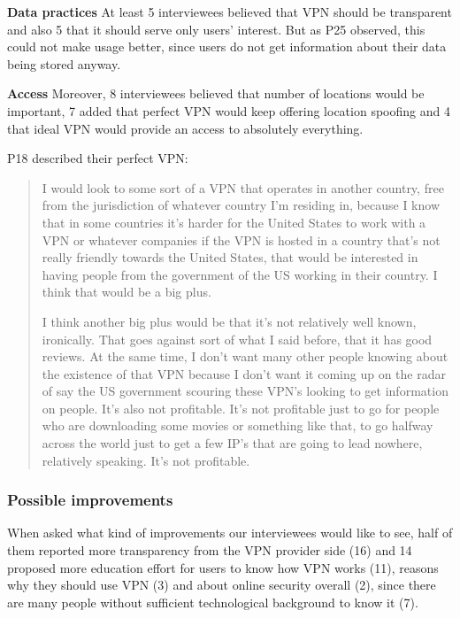 \textbf{Data practices} At least 5 interviewees believed that VPN should be transparent and also 5 that it should serve only users' interest. But as P25 observed, this could not make usage better, since users do not get information about their data being stored anyway.


\textbf{Access} Moreover, 8 interviewees believed that number of locations would be important, 7 added that perfect VPN would keep offering location spoofing and 4 that ideal VPN would provide an access to absolutely everything.

P18 described their perfect VPN:
\begin{quote}I would look to some sort of a VPN that operates in another country, free from the jurisdiction of whatever country I'm residing in, because I know that in some countries it's harder for the United States to work with a VPN or whatever companies if the VPN is hosted in a country that's not really friendly towards the United States, that would be interested in having people from the government of the US working in their country. I think that would be a big plus.


I think another big plus would be that it's not relatively well known, ironically. That goes against sort of what I said before, that it has good reviews. At the same time, I don't want many other people knowing about the existence of that VPN because I don't want it coming up on the radar of say the US government scouring these VPN's looking to get information on people. It's also not profitable. It's not profitable just to go for people who are downloading some movies or something like that, to go halfway across the world just to get a few IP's that are going to lead nowhere, relatively speaking. It's not profitable.\end{quote}


\subsubsection{Possible improvements}
When asked what kind of improvements our interviewees would like to see, half of them reported more transparency from the VPN provider side (16) and 14 proposed more education effort for users to know how VPN works (11), reasons why they should use VPN (3) and about online security overall (2), since there are many people without sufficient technological background to know it (7). 

